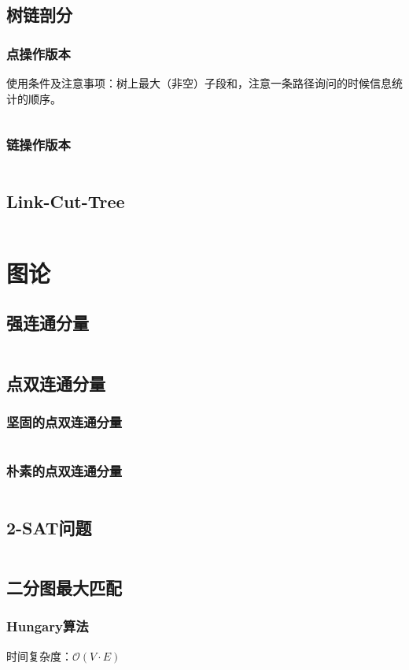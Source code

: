 \documentclass[a4paper,openany]{book}
\newcommand{\cppcode}[1]{
    \inputminted[mathescape,
    			 tabsize=4,
    			 linenos,
    			 frame=single,
    			 framesep=2mm,
    			 breakaftergroup=true,
    			 breakautoindent=true,
    			 breakbytoken=true,
    			 breaklines=true
    ]{cpp}{#1}
}
\begin{document}
\begin{spacing}{1.0}
		\section{树链剖分}
			\subsection{点操作版本}
				使用条件及注意事项：树上最大（非空）子段和，注意一条路径询问的时候信息统计的顺序。
				\cppcode{Source/Data-Structure/Heavy-Light-Decomposition-Point.cpp}
			\subsection{链操作版本}
				\cppcode{Source/Data-Structure/Heavy-Light-Decomposition-Chain.cpp}
		\section{Link-Cut-Tree}
			\cppcode{Source/Data-Structure/Link-Cut-Tree.cpp}
	\chapter{图论}
		\section{强连通分量}
			\cppcode{Source/Graph-Theory/Strongly-Connected-Components.cpp}
		\section{点双连通分量}
		\subsection{坚固的点双连通分量}
			\cppcode{Source/Graph-Theory/Super-Double-Connected-Component.cpp}
		\subsection{朴素的点双连通分量}
			\cppcode{Source/Graph-Theory/Normal-Double-Connected-Component.cpp}
		\section{2-SAT问题}
			\cppcode{Source/Graph-Theory/Two-Satisfiability.cpp}
		\section{二分图最大匹配}
			\subsection{Hungary算法}
				时间复杂度：$\mathcal{O}(V \cdot E)$
				\cppcode{Source/Graph-Theory/Maximum-Matching-Hungary.cpp}

\end{spacing}
\end{document}
